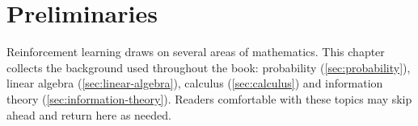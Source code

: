 \chapter{Preliminaries}
\label{chap:preliminaries}

Reinforcement learning draws on several areas of mathematics. This chapter collects the background used throughout the book: probability (\cref{sec:probability}), linear algebra (\cref{sec:linear-algebra}), calculus (\cref{sec:calculus}) and information theory (\cref{sec:information-theory}). Readers comfortable with these topics may skip ahead and return here as needed.





